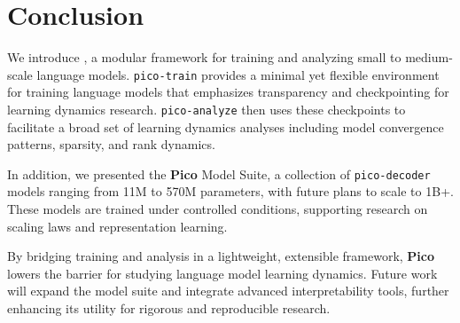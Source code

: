 \section{Conclusion}

We introduce \pico, a modular framework for training and analyzing small to medium-scale language models. \texttt{pico-train} provides a minimal yet flexible environment for training language models that emphasizes transparency and checkpointing for learning dynamics research. \texttt{pico-analyze} then uses these checkpoints to facilitate a broad set of learning dynamics analyses including model convergence patterns, sparsity, and rank dynamics.

In addition, we presented the \textbf{Pico} Model Suite, a collection of \texttt{pico-decoder} models ranging from 11M to 570M parameters, with future plans to scale to 1B+. These models are trained under controlled conditions, supporting research on scaling laws and representation learning.

By bridging training and analysis in a lightweight, extensible framework, \textbf{Pico} lowers the barrier for studying language model learning dynamics. Future work will expand the model suite and integrate advanced interpretability tools, further enhancing its utility for rigorous and reproducible research.





